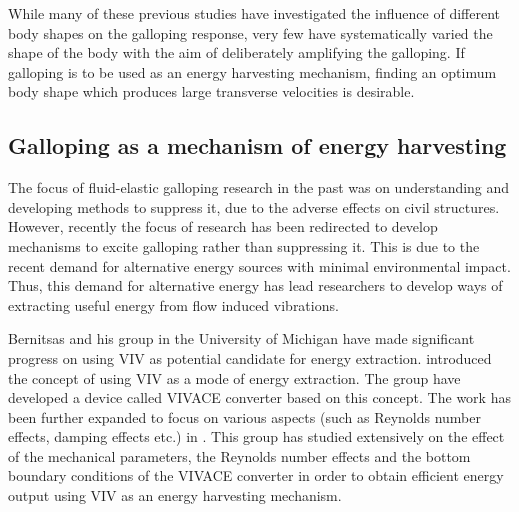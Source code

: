 While many of these previous studies have investigated the influence of different body shapes on the galloping response, very few have systematically varied the shape of the body with the aim of deliberately amplifying the galloping. If galloping is to be used as an energy harvesting mechanism, finding an optimum body shape which produces large transverse velocities is desirable.


\subsection{Galloping as a mechanism of energy harvesting}

The focus of fluid-elastic galloping research in the past was on understanding and developing methods to suppress it, due to the adverse effects on civil structures. However, recently the focus of research has been redirected to develop mechanisms to excite galloping rather than suppressing it. This is due to the recent demand for alternative energy sources with minimal environmental impact. Thus, this demand for alternative energy has lead researchers to develop ways of extracting useful energy from flow induced vibrations.

Bernitsas and his group in the University of Michigan have made significant progress on using VIV as potential candidate for energy extraction. \cite{Bernitsas2008a-concept} introduced the concept of using VIV as a mode of energy extraction. The group have developed a device called VIVACE converter based on this concept. The work has been further expanded to focus on various aspects (such as Reynolds number effects, damping effects etc.) in \citet{Bernitsas2009,Raghavan2009,Raghavan2010a,Lee2011a}. This group has studied extensively on the effect of the mechanical parameters, the Reynolds number effects and the bottom boundary conditions of the VIVACE converter in order to obtain efficient energy output using VIV as an energy harvesting mechanism. 

